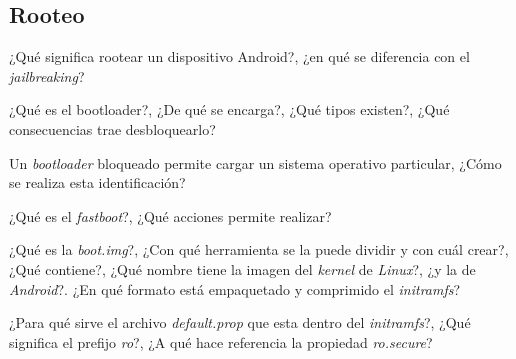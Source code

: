 \subsection{Rooteo}
\begin{questions}
  \question ¿Qué significa rootear un dispositivo Android?, ¿en qué se diferencia con el \textit{jailbreaking}?

  \question ¿Qué es el bootloader?, ¿De qué se encarga?, ¿Qué tipos existen?, ¿Qué consecuencias trae desbloquearlo?
  
  \question Un \textit{bootloader} bloqueado permite cargar un sistema operativo particular, ¿Cómo se realiza esta identificación?
  
  \question ¿Qué es el \textit{fastboot}?, ¿Qué acciones permite realizar?
  
  \question ¿Qué es la \textit{boot.img}?, ¿Con qué herramienta se la puede dividir y con cuál crear?, ¿Qué contiene?, ¿Qué nombre tiene la imagen del \textit{kernel} de \textit{Linux}?, ¿y la de \textit{Android}?. ¿En qué formato está empaquetado y comprimido el \textit{initramfs}?
  
  \question ¿Para qué sirve el archivo \textit{default.prop} que esta dentro del \textit{initramfs}?, ¿Qué significa el prefijo \textit{ro}?, ¿A qué hace referencia la propiedad \textit{ro.secure}?
\end{questions}